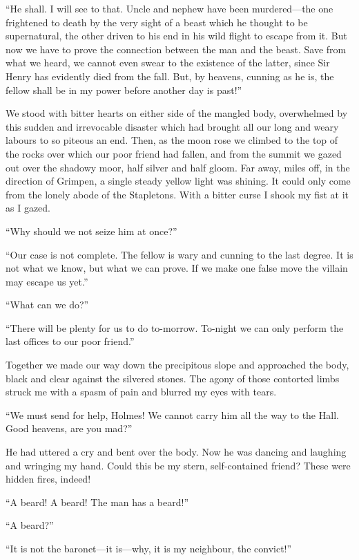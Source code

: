 \documentclass[paper=5.5in:8.5in,BCOR=7mm,twoside,DIV=calc,12pt,usegeometry,openany,chapterprefix,endperiod,headings=big]{scrbook} %
\begin{document}
\enquote{He shall. I will see to that. Uncle and nephew have been murdered---the one frightened to death by the very sight of a beast which he thought to be supernatural, the other driven to his end in his wild flight to escape from it. But now we have to prove the connection between the man and the beast. Save from what we heard, we cannot even swear to the existence of the latter, since Sir Henry has evidently died from the fall. But, by heavens, cunning as he is, the fellow shall be in my power before another day is past!}

We stood with bitter hearts on either side of the mangled body, overwhelmed by this sudden and irrevocable disaster which had brought all our long and weary labours to so piteous an end. Then, as the moon rose we climbed to the top of the rocks over which our poor friend had fallen, and from the summit we gazed out over the shadowy moor, half silver and half gloom. Far away, miles off, in the direction of Grimpen, a single steady yellow light was shining. It could only come from the lonely abode of the Stapletons. With a bitter curse I shook my fist at it as I gazed.

\enquote{Why should we not seize him at once?}

\enquote{Our case is not complete. The fellow is wary and cunning to the last degree. It is not what we know, but what we can prove. If we make one false move the villain may escape us yet.}

\enquote{What can we do?}

\enquote{There will be plenty for us to do to-morrow. To-night we can only perform the last offices to our poor friend.}

Together we made our way down the precipitous slope and approached the body, black and clear against the silvered stones. The agony of those contorted limbs struck me with a spasm of pain and blurred my eyes with tears.

\enquote{We must send for help, Holmes! We cannot carry him all the way to the Hall. Good heavens, are you mad?}

He had uttered a cry and bent over the body. Now he was dancing and laughing and wringing my hand. Could this be my stern, self-contained friend? These were hidden fires, indeed!

\enquote{A beard! A beard! The man has a beard!}

\enquote{A beard?}

\enquote{It is not the baronet---it is---why, it is my neighbour, the convict!}
\end{document}
